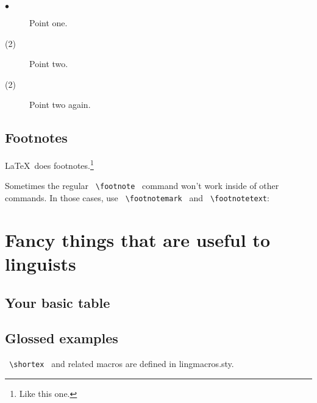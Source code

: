 \begin{description}
\item[$\bullet$] Point one.
\item[(2)] Point two.
\item[\textnormal{(2)}] Point two again.
\end{description}

\subsection{Footnotes}
\label{othersection}

\LaTeX\ does footnotes.\footnote{Like this one.}

Sometimes the regular \verb+ \footnote + command won't work inside of
other commands.  In those cases, use \verb+ \footnotemark +
and \verb+ \footnotetext+:


\section{Fancy things that are useful to linguists}

\subsection{Your basic table}


\subsection{Glossed examples}

\verb+ \shortex + and related macros are defined in lingmacros.sty.


